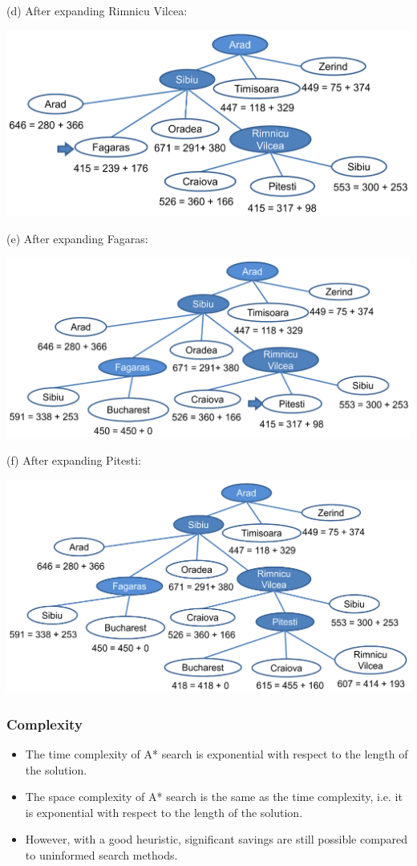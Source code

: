 \documentclass[11pt]{article}
\begin{document}
(d) After expanding Rimnicu Vilcea:
\begin{center}
\includegraphics[width=.9\linewidth]{./images/a-star-search-example-fourth-step-diagram.png}
\end{center}

(e) After expanding Fagaras:
\begin{center}
\includegraphics[width=.9\linewidth]{./images/a-star-search-example-fifth-step-diagram.png}
\end{center}

 \newpage

(f) After expanding Pitesti:
\begin{center}
\includegraphics[width=.9\linewidth]{./images/a-star-search-example-sixth-step-diagram.png}
\end{center}
\subsubsection{Complexity}
\label{sec:orge05451f}
\begin{itemize}
\item The time complexity of A* search is exponential with respect to the length of the solution.
\item The space complexity of A* search is the same as the time complexity, i.e. it is exponential with respect to the length of the solution.
\item However, with a good heuristic, significant savings are still possible compared to uninformed search methods.
\end{itemize}
\end{document}
